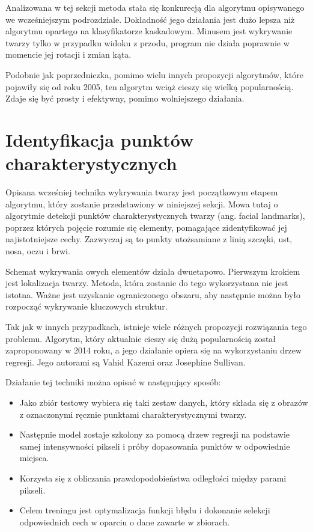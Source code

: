Analizowana w tej sekcji metoda stała się konkurecją dla algorytmu opisywanego we wcześniejszym podrozdziale. Dokładność jego działania jest dużo lepsza niż algorytmu opartego na klasyfikatorze kaskadowym. Minusem jest wykrywanie twarzy tylko w przypadku widoku z przodu, program nie działa poprawnie w momencie jej rotacji i zmian kąta.

Podobnie jak poprzedniczka, pomimo wielu innych propozycji algorytmów, które pojawiły się od roku 2005, ten algorytm wciąż cieszy się wielką popularnością. Zdaje się być prosty i efektywny, pomimo wolniejszego działania.

\section{Identyfikacja punktów charakterystycznych}
\label{sec:landmarks}
Opisana wcześniej technika wykrywania twarzy jest początkowym etapem algorytmu, który zostanie przedstawiony w niniejszej sekcji. Mowa tutaj o algorytmie detekcji punktów charakterystycznych twarzy (ang. facial landmarks), poprzez których pojęcie rozumie się elementy, pomagające zidentyfikować jej najistotniejsze cechy. Zazwyczaj są to punkty utożsamiane z linią szczęki, ust, nosa, oczu i brwi. 

Schemat wykrywania owych elementów działa dwuetapowo. Pierwszym krokiem jest lokalizacja twarzy. Metoda, która zostanie do tego wykorzystana nie jest istotna. Ważne jest uzyskanie ograniczonego obszaru, aby następnie można było rozpocząć wykrywanie kluczowych struktur. 

Tak jak w innych przypadkach, istnieje wiele różnych propozycji rozwiązania tego problemu. Algorytm, który aktualnie cieszy się dużą popularnością został zaproponowany w 2014 roku, a jego działanie opiera się na wykorzystaniu drzew regresji. Jego autorami są Vahid Kazemi oraz Josephine Sullivan. 

Działanie tej techniki można opisać w następujący sposób:
\begin{itemize}
    \item Jako zbiór testowy wybiera się taki zestaw danych, który składa się z obrazów z oznaczonymi ręcznie punktami charakterystycznymi twarzy.
    \item Następnie model zostaje szkolony za pomocą drzew regresji na podstawie samej intensywności pikseli i próby dopasowania punktów w odpowiednie miejsca.
    \item  Korzysta się z obliczania prawdopodobieństwa odległości między parami pikseli.
    \item Celem treningu jest optymalizacja funkcji błędu i dokonanie selekcji odpowiednich cech w oparciu o dane zawarte w zbiorach.
\end{itemize}


